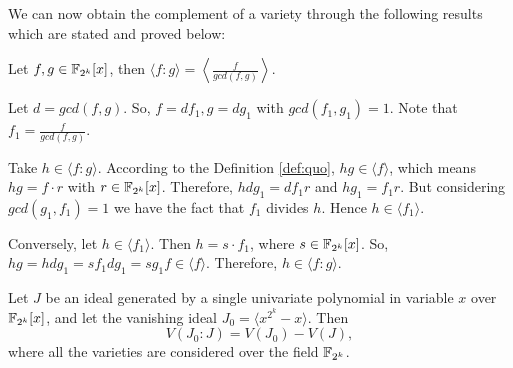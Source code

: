 
We can now obtain the complement of a variety through the following
results which are stated and proved below:

\begin{Lemma}
\label{lem:gcd}
Let $f,g\in {\mathbb{F}}_{2^k}[x]$, then $\langle f:g\rangle = \left\langle\frac{f}{gcd(f,g)}\right\rangle$.
\end{Lemma}

\begin{Proof}
Let $d = gcd(f, g)$. So, $f = df_1 , g = dg_1$ with $gcd(f_1 , g_1 ) =
1$. Note that $f_1 = \frac{f}{gcd(f,g)}$.

Take $h \in \langle f : g\rangle$. According to the
Definition \ref{def:quo}, $hg \in \langle f \rangle$, which means $hg = f
\cdot r$ with $r \in {\mathbb{F}}_{2^k}[x]$. Therefore, $hdg_1 = df_1 r$ and $hg_1 =
f_1 r$. But considering $gcd(g_1 , f_1 ) = 1$ we have the fact that
$f_1$ divides $h$. Hence $h \in \langle f_1\rangle$.

Conversely, let $h \in \langle f_1 \rangle$. Then $h = s \cdot f_1$,
where $s \in {\mathbb{F}}_{2^k}[x]$. So, $hg = hdg_1 = sf_1 dg_1 = sg_1 f \in 
\langle f \rangle$. Therefore, $h \in \langle f : g\rangle$.
\end{Proof}


\begin{Theorem}
\label{thm:quotient}
Let $J$ be an ideal generated by a single univariate polynomial in
variable $x$ over ${\mathbb{F}}_{2^k}[x]$, and let the vanishing ideal $J_0 = \langle
x^{2^k}-x\rangle$. Then  
$${ V}(J_0:J) = { V}(J_0) - { V}(J),$$ where all the varieties are
considered over the field ${\mathbb{F}}_{2^k}$. 
\end{Theorem}

